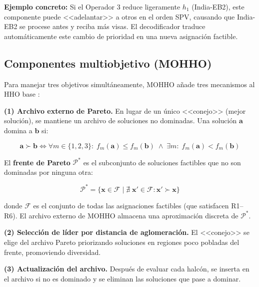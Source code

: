 \documentclass[12pt,letterpaper]{article}
\begin{document}
\textbf{Ejemplo concreto:} Si el Operador 3 reduce ligeramente $h_1$ (India-EB2), este componente puede <<adelantar>> a otros en el orden SPV, causando que India-EB2 se procese antes y reciba más visas. El decodificador traduce automáticamente este cambio de prioridad en una nueva asignación factible.

\subsection{Componentes multiobjetivo (MOHHO)}

Para manejar tres objetivos simultáneamente, MOHHO añade tres mecanismos al HHO base \parencite{heidari2019, kusoglu2020, cerci2022}:

\textbf{(1) Archivo externo de Pareto.} En lugar de un único <<conejo>> (mejor solución), se mantiene un archivo de soluciones no dominadas. Una solución $\mathbf{a}$ domina a $\mathbf{b}$ si:

\begin{formulabox}
\begin{equation}
\mathbf{a} \succ \mathbf{b} \iff \forall m \in \{1,2,3\}:\; f_m(\mathbf{a}) \leq f_m(\mathbf{b}) \;\wedge\; \exists m:\; f_m(\mathbf{a}) < f_m(\mathbf{b})
\label{eq:dominancia}
\end{equation}
\end{formulabox}

El \textbf{frente de Pareto} $\mathcal{P}^*$ es el subconjunto de soluciones factibles que no son dominadas por ninguna otra:

\begin{formulabox}
\begin{equation}
\mathcal{P}^* = \bigl\{\mathbf{x} \in \mathcal{F} \;\big|\; \nexists\; \mathbf{x}' \in \mathcal{F} : \mathbf{x}' \succ \mathbf{x}\bigr\}
\label{eq:pareto_front}
\end{equation}

donde $\mathcal{F}$ es el conjunto de todas las asignaciones factibles (que satisfacen R1--R6). El archivo externo de MOHHO almacena una aproximación discreta de $\mathcal{P}^*$.
\end{formulabox}

\textbf{(2) Selección de líder por distancia de aglomeración.} El <<conejo>> se elige del archivo Pareto priorizando soluciones en regiones poco pobladas del frente, promoviendo diversidad.

\textbf{(3) Actualización del archivo.} Después de evaluar cada halcón, se inserta en el archivo si no es dominado y se eliminan las soluciones que pase a dominar.
\end{document}
